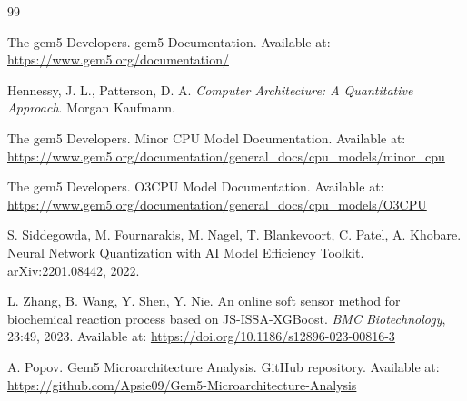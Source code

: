 \documentclass[12pt,a4paper]{article}
\begin{document}
\begin{thebibliography}{99}

The gem5 Developers.
\newblock gem5 Documentation.
\newblock Available at: \url{https://www.gem5.org/documentation/}

Hennessy, J. L., Patterson, D. A.
\newblock \emph{Computer Architecture: A Quantitative Approach}.
\newblock Morgan Kaufmann.

The gem5 Developers.
\newblock Minor CPU Model Documentation.
\newblock Available at: \url{https://www.gem5.org/documentation/general_docs/cpu_models/minor_cpu}

The gem5 Developers.
\newblock O3CPU Model Documentation.
\newblock Available at: \url{https://www.gem5.org/documentation/general_docs/cpu_models/O3CPU}

S. Siddegowda, M. Fournarakis, M. Nagel, T. Blankevoort, C. Patel, A. Khobare.
\newblock Neural Network Quantization with AI Model Efficiency Toolkit.
\newblock arXiv:2201.08442, 2022.

L. Zhang, B. Wang, Y. Shen, Y. Nie.
\newblock An online soft sensor method for biochemical reaction process based on JS-ISSA-XGBoost.
\newblock \emph{BMC Biotechnology}, 23:49, 2023.
\newblock Available at: \url{https://doi.org/10.1186/s12896-023-00816-3}

A. Popov.
\newblock Gem5 Microarchitecture Analysis.
\newblock GitHub repository.
\newblock Available at: \url{https://github.com/Apsie09/Gem5-Microarchitecture-Analysis}

\end{thebibliography}
\end{document}
